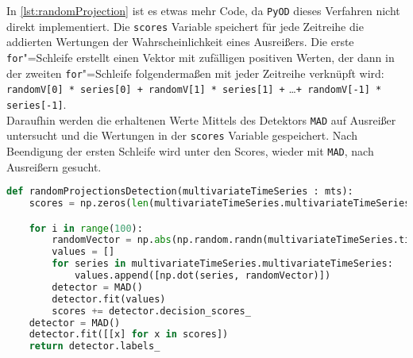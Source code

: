 In \autoref{lst:randomProjection} ist es etwas mehr Code, da \lstinline|PyOD| dieses Verfahren nicht direkt implementiert. Die \lstinline|scores| Variable speichert für jede Zeitreihe die addierten Wertungen der Wahrscheinlichkeit eines Ausreißers. Die erste \lstinline|for|"=Schleife erstellt einen Vektor mit zufälligen positiven Werten, der dann in der zweiten \lstinline|for|"=Schleife folgendermaßen mit jeder Zeitreihe verknüpft wird: \\ \lstinline[breaklines=true]|randomV[0] * series[0] + randomV[1] * series[1] +| \dots{}\lstinline|+ randomV[-1] * series[-1]|. \\ Daraufhin werden die erhaltenen Werte Mittels des Detektors \lstinline|MAD| auf Ausreißer untersucht und die Wertungen in der \lstinline|scores| Variable gespeichert. Nach Beendigung der ersten Schleife wird unter den Scores, wieder mit \lstinline|MAD|, nach Ausreißern gesucht.
\begin{lstlisting}[caption=Stückweise polynomielle Approximation, label=lst:randomProjection, style=Python, language=Python]
def randomProjectionsDetection(multivariateTimeSeries : mts):
    scores = np.zeros(len(multivariateTimeSeries.multivariateTimeSeries))

    for i in range(100):
        randomVector = np.abs(np.random.randn(multivariateTimeSeries.timeSeriesLength))
        values = []
        for series in multivariateTimeSeries.multivariateTimeSeries:
            values.append([np.dot(series, randomVector)])
        detector = MAD()
        detector.fit(values)
        scores += detector.decision_scores_
    detector = MAD()
    detector.fit([[x] for x in scores])
    return detector.labels_
\end{lstlisting}